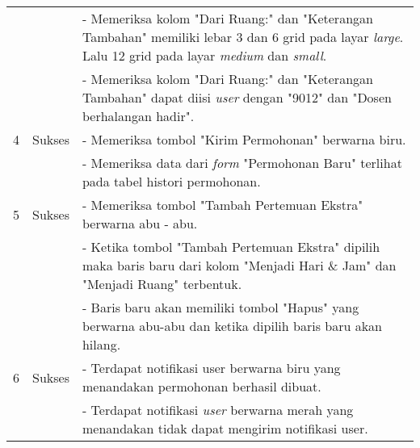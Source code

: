 \begin{table}
\begin{tabular}{|c| c| p{}|}
			&& - Memeriksa kolom "Dari Ruang:" dan "Keterangan Tambahan" memiliki lebar 3 dan 6 grid pada layar \textit{large}. Lalu 12 grid pada layar \textit{medium} dan \textit{small}.\\
			&& - Memeriksa kolom "Dari Ruang:" dan "Keterangan Tambahan" dapat diisi \textit{user} dengan "9012" dan "Dosen berhalangan hadir".\\
			\hline
			4 & Sukses & - Memeriksa tombol "Kirim Permohonan" berwarna biru.\\
			&& - Memeriksa data dari \textit{form} "Permohonan Baru" terlihat pada tabel histori permohonan.\\
			\hline
			5 & Sukses & - Memeriksa tombol "Tambah Pertemuan Ekstra" berwarna abu - abu.\\
			&& - Ketika tombol "Tambah Pertemuan Ekstra" dipilih maka baris baru dari kolom "Menjadi Hari \& Jam" dan "Menjadi Ruang" terbentuk.\\
			&& - Baris baru akan memiliki tombol "Hapus" yang berwarna abu-abu dan ketika dipilih baris baru akan hilang.\\
			\hline
			6 & Sukses & - Terdapat notifikasi user berwarna biru yang menandakan permohonan berhasil dibuat.\\
			&&- Terdapat notifikasi \textit{user} berwarna merah yang menandakan tidak dapat mengirim notifikasi user.\\		
			
			\bottomrule		
		\end{tabular} 
\end{table}

